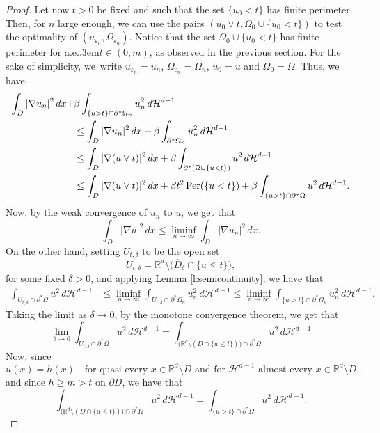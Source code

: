 \documentclass[11pt]{article}
\numberwithin{equation}{section}
\renewcommand{\ae}{a.e.\kern.3em}
\newcommand{\Per}{\mathrm{Per}}
\theoremstyle{plain}
\theoremstyle{definition}
\let\eps\varepsilon
\def\R{\mathbb{R}}
\def\HH{\mathcal{H}}
\begin{document}
\begin{proof}
Let now $t>0$ be fixed and such that the set $\{u_0<t\}$ has finite perimeter. Then, for $n$ large enough, we can use the pairs
$(u_0\vee t, \Omega_0\cup\{u_0< t\})$ to test the optimality of $(u_{\eps_n},\Omega_{\eps_n})$.
Notice that the set $\Omega_0\cup\{u_0< t\}$ has finite perimeter for \ae $t\in (0,m)$, as observed in the previous section.
For the sake of simplicity, we~write $u_{\eps_n}=u_n$, $\Omega_{\eps_n}=\Omega_n$, $u_0=u$ and $\Omega_0=\Omega$. Thus, we have
\begin{align}
\int_{D}|\nabla u_{n}|^2\,dx+&\beta\int_{\{u> t\}\cap \partial^\ast\Omega_{n}}u_{n}^2\,d\HH^{d-1}\notag\\
&\le \int_{D}|\nabla u_{n}|^2\,dx+\beta\int_{\partial^\ast\Omega_{n}}u_{n}^2\,d\HH^{d-1}\notag\\
&\le \int_{D}|\nabla (u\vee t)|^2\,dx+\beta\int_{\partial^\ast(\Omega\cup\{u<t\})}u^2\,d\HH^{d-1}\label{e:att}\\
&\le \int_{D}|\nabla (u\vee t)|^2\,dx+\beta t^2\, \Per(\{u<t\})+\beta\int_{\{u> t\}\cap \partial^\ast\Omega}u^2\,d\HH^{d-1}.\notag
\end{align}
Now, by the weak convergence of $u_n$ to $u$, we get that
\[\int_{D}|\nabla u|^2\,dx\le \liminf_{n\to\infty}\int_{D}|\nabla u_{n}|^2\,dx.\]
On the other hand, setting $U_{t,\delta}$ to be the open set
\[U_{t,\delta}=\R^d\setminus \big(\overline D_\delta\cap\{u\le t\}\big),\]
for some fixed $\delta>0$, and applying Lemma \ref{l:semicontinuity}, we have that
\begin{align*}
\int_{U_{t,\delta}\cap \partial^\ast\Omega}u^2\,d\HH^{d-1}&\le \liminf_{n\to\infty}\int_{U_{t,\delta}\cap \partial^\ast\Omega_{n}}u_{n}^2\,d\HH^{d-1}\le \liminf_{n\to\infty}\int_{\{u>t\}\cap \partial^\ast\Omega_{n}}u_{n}^2\,d\HH^{d-1}.
\end{align*}
Taking the limit as $\delta\to0$, by the monotone convergence theorem, we get that
\[\lim_{\delta\to0}\int_{U_{t,\delta}\cap \partial^\ast\Omega}u^2\,d\HH^{d-1}=\int_{\big(\R^d\setminus (D\cap\{u\le t\})\big)\cap \partial^\ast\Omega}u^2\,d\HH^{d-1}\]
Now, since
\[u(x)=h(x)\quad\text{for quasi-every } x\in \R^d\setminus D\text{ and for } \HH^{d-1}\text{-almost-every } x\in \R^d\setminus D,\]
and since $h\ge m>t$ on $\partial D$, we have that
\begin{equation}%
\int_{\big(\R^d\setminus (D\cap\{u\le t\})\big)\cap \partial^\ast\Omega}u^2\,d\HH^{d-1}=\int_{\{u>t\}\cap \partial^\ast\Omega}u^2\,d\HH^{d-1}.
\end{equation}

\end{proof}
\end{document}
